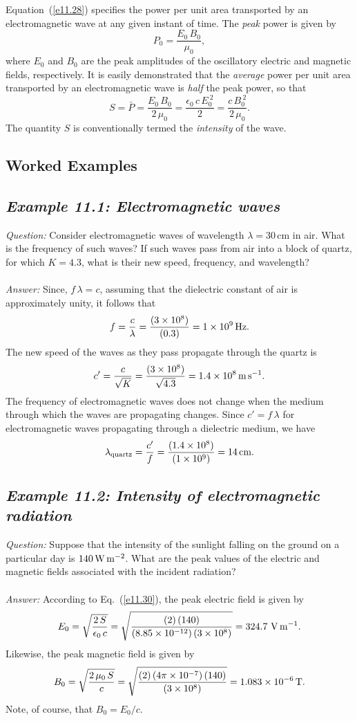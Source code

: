 Equation~(\ref{e11.28}) specifies the power per unit area transported by an electromagnetic
wave at any given instant of time. The {\em peak} power  is given by
\begin{equation}
P_0 = \frac{E_0\,B_0}{\mu_0},
\end{equation}
where $E_0$ and $B_0$ are the peak amplitudes of the oscillatory
electric and
magnetic fields, respectively. It is easily demonstrated that
the {\em average} power per unit area transported by an electromagnetic wave 
is {\em half} the peak power, so that
\begin{equation}\label{e11.30}
S= \bar{P} = \frac{E_0\,B_0}{2\,\mu_0} = \frac{\epsilon_0\,c\,E_0^{~2}}{2}
= \frac{c\,B_0^{~2}}{2\,\mu_0}.
\end{equation}
The quantity $S$ is conventionally termed the {\em intensity} of the wave. 

\subsection{Worked Examples}
\subsection*{\em Example 11.1: Electromagnetic waves}
{\em Question:} Consider  electromagnetic waves of wavelength
$\lambda = 30$\,cm in air. What is the frequency of such waves? If such waves pass
from air into a block of quartz, for which $K=4.3$, what is their new
speed, frequency, and wavelength?\\
~\\
{\em Answer:} Since, $f\,\lambda=c$, assuming that the dielectric constant of air is approximately unity, it follows that
$$
f = \frac{c}{\lambda} = \frac{(3\times 10^8)}{(0.3)} = 1\times 10^9\,{\rm Hz}.
$$
The new speed of the waves as they pass propagate through the
quartz is
$$
c' = \frac{c}{\sqrt{K}} = \frac{(3\times 10^8)}{\sqrt{4.3}} = 1.4\times
 10^8\,{\rm m}\,{\rm s}^{-1}.
$$
The frequency of electromagnetic waves  does not change when the medium through
which the waves are  propagating changes. Since $c'=f\,\lambda$ for
electromagnetic waves propagating through a dielectric medium, we have
$$
\lambda_{\rm  quartz} = \frac{c'}{f} = \frac{(1.4\times 10^8)}
{(1\times 10^9)} =  14\,{\rm cm}.
$$

\subsection*{\em Example 11.2: Intensity of electromagnetic radiation}
{\em Question:} Suppose that the intensity of the sunlight falling on the
ground on a particular day is $140\,{\rm W}\,{\rm m}^{-2}$. What are the
peak values of the electric and magnetic fields associated with the
incident radiation?\\
~\\
{\em Answer:} According to Eq.~(\ref{e11.30}), the peak electric field is given by
$$
E_0 = \sqrt{\frac{2\,S}{\epsilon_0\,c}} = \sqrt{\frac{(2)\,(140)}
{(8.85\times 10^{-12})\,(3\times 10^8)}} = 324.7\,\,{\rm V}\,{\rm m}^{-1}.
$$
Likewise, the peak magnetic field is given by
$$
B_0 = \sqrt{\frac{2\,\mu_0\,S}{c}} = \sqrt{\frac{(2)\,(4\pi\times 10^{-7})\,(140)}
{(3\times 10^8)}} = 1.083\times 10^{-6}\,{\rm T}.
$$
Note, of course, that $B_0=E_0/c$. 
